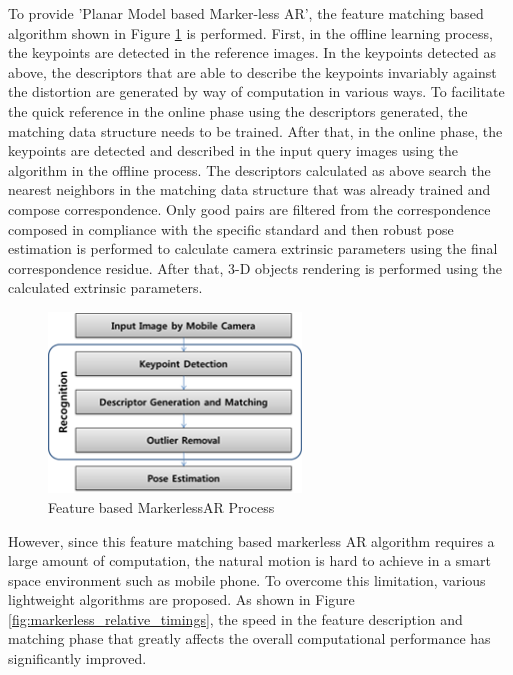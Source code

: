 To provide 'Planar Model based Marker-less AR', the feature matching based algorithm shown in Figure \ref{fig:markerless_feature_process} is performed. First, in the offline learning process, the keypoints are detected in the reference images. In the keypoints detected as above, the descriptors that are able to describe the keypoints invariably against the distortion are generated by way of computation in various ways. To facilitate the quick reference in the online phase using the descriptors generated, the matching data structure needs to be trained. After that, in the online phase, the keypoints are detected and described in the input query images using the algorithm in the offline process. The descriptors calculated as above search the nearest neighbors in the matching data structure that was already trained and compose correspondence. Only good pairs are filtered from the correspondence composed in compliance with the specific standard and then robust pose estimation is performed to calculate camera extrinsic parameters using the final correspondence residue. After that, 3-D objects rendering is performed using the calculated extrinsic parameters. 
\begin{figure}[ht!]
\centering
\includegraphics[width=0.6\textwidth]{2_relworks/process}
\caption{Feature based MarkerlessAR Process}
\label{fig:markerless_feature_process}
\end{figure}


However, since this feature matching based markerless AR algorithm requires a large amount of computation, the natural motion is hard to achieve in a smart space environment such as mobile phone. To overcome this limitation, various lightweight algorithms are proposed. As shown in Figure \ref{fig:markerless_relative_timings}, the speed in the feature description and matching phase that greatly affects the overall computational performance has significantly improved. 

